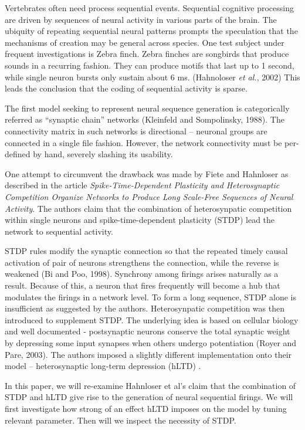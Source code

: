 Vertebrates often need process sequential events. Sequential cognitive processing are driven by sequences of neural activity in various parts of the brain. The ubiquity of repeating sequential neural patterns prompts the speculation that the mechanisms of creation may be general across species. One test subject under frequent investigations is Zebra finch. Zebra finches are songbirds that produce sounds in a recurring fashion.  They can produce motifs that last up to 1 second, while single neuron bursts only sustain about 6 ms. (Hahnoloser \textit{et al.}, 2002)  This leads the conclusion that the coding of sequential activity is sparse. 

The first model seeking to represent neural sequence generation is categorically referred as “synaptic chain” networks (Kleinfeld and Sompolinsky, 1988). The connectivity matrix in such networks is directional – neuronal groups are connected in a single file fashion. However, the network connectivity must be per-defined by hand, severely slashing its usability. 

One attempt to circumvent the drawback was made by Fiete and Hahnloser as described in the article \textit{Spike-Time-Dependent Plasticity and Heterosynaptic Competition Organize Networks to Produce Long Scale-Free Sequences of Neural Activity}. The authors claim that the combination of heterosynpatic competition within single neurons and spike-time-dependent plasticity (STDP) lead the network to sequential activity. 

STDP rules modify the synaptic connection so that the repeated timely causal activation of pair of neurons strengthens the connection, while the reverse is weakened (Bi and Poo, 1998). Synchrony among firings arises naturally as a result. Because of this, a neuron that fires frequently will become a hub that modulates the firings in a network level. To form a long sequence, STDP alone is insufficient as suggested by the authors. Heterosynpatic competition was then introduced to supplement STDP. The underlying idea is  based on cellular biology and well documented - postsynaptic neurons conserve the total synaptic weight by depressing some input synapses when others undergo potentiation (Royer and Pare, 2003). The authors imposed a slightly different implementation onto their model – heterosynaptic long-term depression (hLTD) .


In this paper, we will re-examine Hahnloser et al's claim that the combination of STDP and hLTD give rise to the generation of neural sequential firings. We will first investigate how strong of an effect hLTD imposes on the model by tuning relevant parameter. Then will we inspect the necessity of  STDP. 
